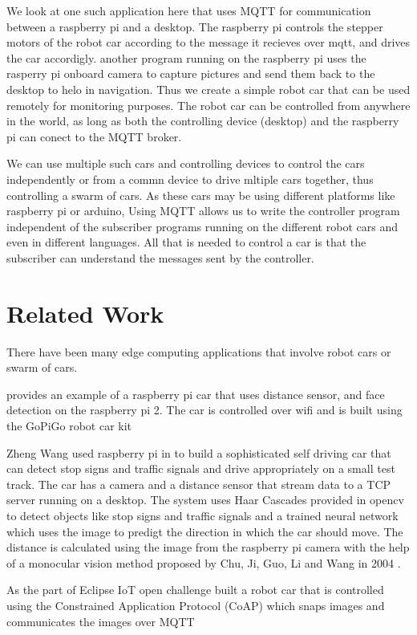 \documentclass[sigconf]{acmart}
\begin{document}
We look at one such application here that uses MQTT for communication between a raspberry pi and a desktop. The raspberry pi controls the stepper motors of the robot car according to the message it recieves over mqtt, and drives the car accordigly. another program running on the raspberry pi uses the rasperry pi onboard camera to capture pictures and send them back to the desktop to helo in navigation. Thus we create a simple robot car that can be used remotely for monitoring purposes. The robot car can be controlled from anywhere in the world, as long as both the controlling device (desktop) and the raspberry pi can conect to the MQTT broker.

We can use multiple such cars and controlling devices to control the cars independently or from a commn device to drive mltiple cars together, thus controlling a swarm of cars. As these cars may be using different platforms like raspberry pi or arduino, Using MQTT allows us to write the controller program independent of the subscriber programs running on the different robot cars and even in different languages. All that is needed to control a car is that the subscriber can understand the messages sent by the controller.

\section{Related Work}
There have been many edge computing applications that involve robot cars or swarm of cars.

\cite{sentdex-pi-car} provides an example of a raspberry pi car that uses distance sensor, and face detection on the raspberry pi 2. The car is controlled over wifi and is built using the GoPiGo robot car kit \cite{gopigo}

Zheng Wang used raspberry pi in \cite{self-driving-rc-car} to build a sophisticated self driving car that can detect stop signs and traffic signals and drive appropriately on a small test track. The car has a camera and a distance sensor that stream data to a TCP server running on a desktop. The system uses Haar Cascades provided in opencv to detect objects like stop signs and traffic signals and a trained neural network which uses the image to predigt the direction in which the car should move. The distance is calculated using the image from the raspberry pi camera with the help of a monocular vision method proposed by Chu, Ji, Guo, Li and Wang in 2004 \cite{monocular}.
 
As the part of Eclipse IoT open challenge \cite{bitreactive} built a robot car that is controlled using the Constrained Application Protocol (CoAP) which snaps images and communicates the images over MQTT
\end{document}
